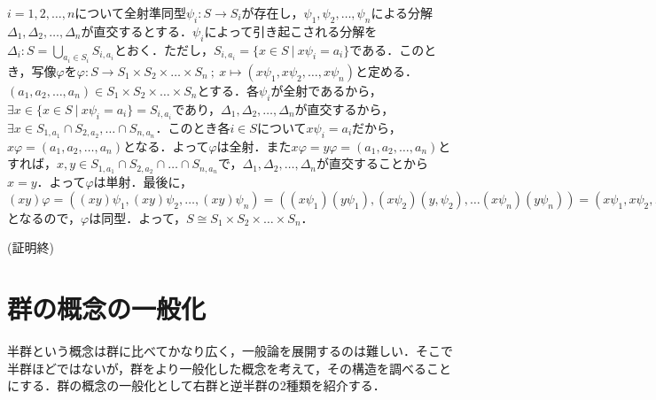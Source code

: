 \documentclass{jsarticle}
\begin{document}
$i=1,2,\dots,n$について全射準同型$\psi_i:S\rightarrow S_i$が存在し，$\psi_1,\psi_2,\dots,\psi_n$による分解$\Delta_1,\Delta_2,\dots,\Delta_n$が直交するとする．$\psi_i$によって引き起こされる分解を$\Delta_i:S=\displaystyle\bigcup_{a_i\in S_i}S_{i,a_i}$とおく．ただし，$S_{i,a_i}=\{x\in S\:|\:x\psi_i=a_i\}$である．このとき，写像$\varphi$を$\varphi:S\rightarrow S_1\times S_2\times \dots\times S_n\:;\:x\mapsto (x\psi_1,x\psi_2,\dots,x\psi_n)$と定める．$(a_1,a_2,\dots,a_n)\in S_1\times S_2\times\dots\times S_n$とする．各$\psi_i$が全射であるから，$\exists x\in \{x\in S\:|\:x\psi_i=a_i\}=S_{i,a_i}$であり，$\Delta_1,\Delta_2,\dots,\Delta_n$が直交するから，$\exists x\in S_{1,a_1}\cap S_{2,a_2},\dots\cap S_{n,a_n}$．このとき各$i\in S$について$x\psi_i=a_i$だから，$x\varphi=(a_1,a_2,\dots,a_n)$となる．よって$\varphi$は全射．また$x\varphi=y\varphi=(a_1,a_2,\dots,a_n)$とすれば，$x,y\in S_{1,a_1}\cap S_{2,a_2}\cap\dots\cap S_{n,a_n}$で，$\Delta_1,\Delta_2,\dots,\Delta_n$が直交することから$x=y$．よって$\varphi$は単射．最後に，$(xy)\varphi=((xy)\psi_1,(xy)\psi_2,\dots,(xy)\psi_n)=((x\psi_1)(y\psi_1),(x\psi_2)(y,\psi_2),\dots(x\psi_n)(y\psi_n))=(x\psi_1,x\psi_2,\dots,x\psi_n)(y\psi_1,y\psi_2,\dots,y\psi_n)$となるので，$\varphi$は同型．よって，$S\cong S_1\times S_2\times\dots\times S_n$．
\begin{flushright}
(証明終)
\end{flushright}
\section{群の概念の一般化}
半群という概念は群に比べてかなり広く，一般論を展開するのは難しい．そこで半群ほどではないが，群をより一般化した概念を考えて，その構造を調べることにする．群の概念の一般化として右群と逆半群の2種類を紹介する．
\end{document}
